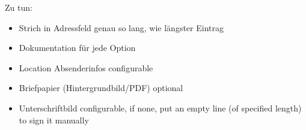 \documentclass[twoside]{brbrief}
\begin{document}
	\maketitle{}
	
	\lipsum[1-2]
	
	Zu tun:
	\begin{itemize}
		\item Strich in Adressfeld genau so lang, wie längster Eintrag
		\item Dokumentation für jede Option
		\item Location Absenderinfos configurable
		\item Briefpapier (Hintergrundbild/PDF) optional
		\item Unterschriftbild configurable, if none, put an empty line (of specified length) to sign it manually
	\end{itemize}
	
	
	
	
	
\end{document}
